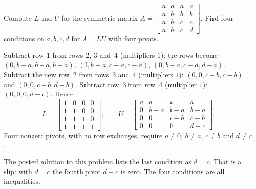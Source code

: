 \begin{exercise}\label{ex:u05-abcd}
Compute $L$ and $U$ for the symmetric matrix
$A=\begin{bmatrix} a&a&a&a\\ a&b&b&b\\ a&b&c&c\\ a&b&c&d\end{bmatrix}$. Find four conditions on
$a,b,c,d$ for $A=LU$ with four pivots.
\end{exercise}
\begin{solution}
Subtract row~1 from rows~2, 3 and~4 (multipliers $1$): the rows become
$(0,b-a,b-a,b-a)$, $(0,b-a,c-a,c-a)$, $(0,b-a,c-a,d-a)$. Subtract the new row~2 from rows~3
and~4 (multipliers $1$): $(0,0,c-b,c-b)$ and $(0,0,c-b,d-b)$. Subtract row~3 from row~4
(multiplier $1$): $(0,0,0,d-c)$. Hence
\[
  L=\begin{bmatrix} 1&0&0&0\\ 1&1&0&0\\ 1&1&1&0\\ 1&1&1&1\end{bmatrix},\qquad
  U=\begin{bmatrix} a&a&a&a\\ 0&b-a&b-a&b-a\\ 0&0&c-b&c-b\\ 0&0&0&d-c\end{bmatrix}.
\]
Four nonzero pivots, with no row exchanges, require $a\neq0$, $b\neq a$, $c\neq b$ and
$d\neq c$.
\end{solution}

\begin{trap}
The posted solution to this problem lists the last condition as $d=c$. That is a slip: with
$d=c$ the fourth pivot $d-c$ is zero. The four conditions are all inequalities.
\end{trap}

